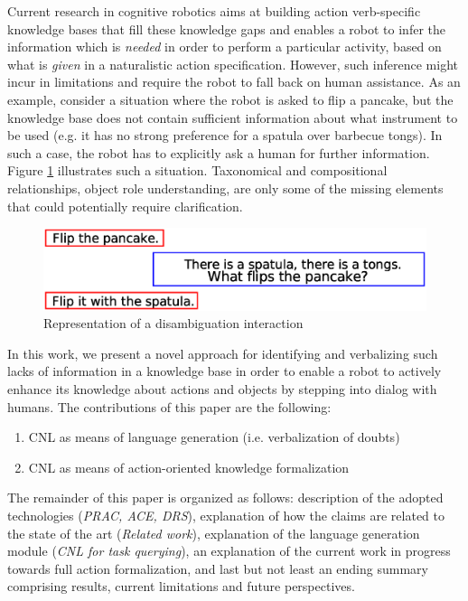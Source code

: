 \documentclass[oribibl]{llncs}
\begin{document}
Current research in cognitive robotics aims at building action 
verb-specific knowledge bases that fill these knowledge gaps and 
enables a robot to infer the information which is \textit{needed} in 
order to perform a particular activity, based on what is \textit 
{given} in a naturalistic action specification. However, such 
inference might incur in limitations and require the robot to fall 
back on human assistance. As an example, consider a situation where 
the robot is asked to flip a pancake, but the knowledge base does 
not contain sufficient information about what instrument to be used 
(e.g. it has no strong preference for a spatula over barbecue 
tongs). In such a case, the robot has to explicitly ask a human for 
further information. Figure \ref{fig:application} illustrates such a 
situation. Taxonomical and compositional relationships, object role 
understanding, are only some of the missing elements that could 
potentially require clarification. 
\begin{figure}[H]
\includegraphics[scale=0.51, trim = 0mm 0mm 0mm 8mm]{introduction.eps}
\caption{Representation of a disambiguation interaction}
\label{fig:application}
\end{figure} 
In this work, we present a novel approach for identifying and 
verbalizing such lacks of information in a knowledge base in order to enable
a robot to actively enhance its knowledge about actions and objects
by stepping into dialog with humans.
The contributions of this paper
are the following:
\begin{enumerate}
    \item CNL as means of language generation (i.e. verbalization of doubts)
    \item CNL as means of action-oriented knowledge formalization
\end{enumerate}
The remainder of this paper is organized as follows: 
description of the adopted technologies (\textit{PRAC, ACE, DRS}), explanation of how the claims are related to the state of the art (\textit{Related work}), explanation of the language generation module (\textit{CNL for task querying}), an explanation of the current work in progress towards full action formalization, and last but not least an ending summary comprising results, current limitations and future perspectives. 
\end{document}
